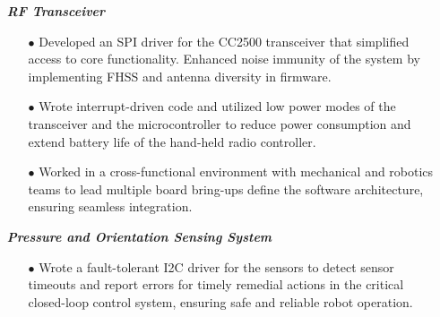 \documentclass[11pt]{article}
\begin{document}
\begin{itemize}[leftmargin=0.01in]\setlength\itemsep{-3pt}
  \item[]  \textbf{\emph{RF Transceiver}}
    \begin{itemize}\setlength{\itemsep}{0pt}\setlength{\parskip}{0pt}\vspace{-0.1em}
      \item[$\bullet$] Developed an SPI driver for the CC2500 transceiver that simplified access to core functionality. Enhanced noise immunity of the system by implementing FHSS and antenna diversity in firmware.
       \item[$\bullet$] Wrote interrupt-driven code and utilized low power modes of the transceiver and the microcontroller to reduce power consumption and extend battery life of the hand-held radio controller.
      \item[$\bullet$] Worked in a cross-functional environment with mechanical and robotics teams to lead multiple board bring-ups define the software architecture, ensuring seamless integration.
    \end{itemize}
  \item[]  \textbf{\emph{Pressure and Orientation Sensing System}}
    \begin{itemize}\setlength{\itemsep}{0pt}\setlength{\parskip}{0pt}\vspace{-0.1em}
      \item[$\bullet$] Wrote a fault-tolerant I2C driver for the sensors to detect sensor timeouts and report errors for timely remedial actions in the critical closed-loop control system, ensuring safe and reliable robot operation.
   \end{itemize}



\end{itemize}
\end{document}
